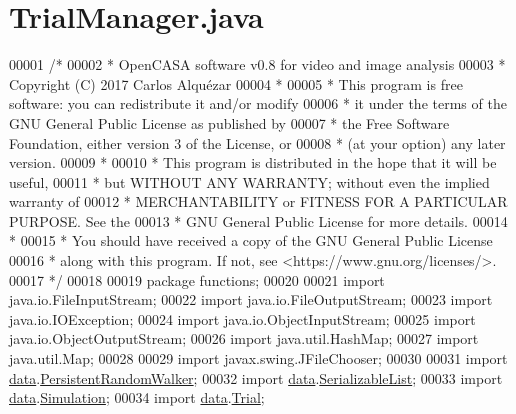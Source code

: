 \hypertarget{_trial_manager_8java_source}{}\section{Trial\+Manager.\+java}
\label{_trial_manager_8java_source}

\begin{DoxyCode}
00001 \textcolor{comment}{/*}
00002 \textcolor{comment}{ *   OpenCASA software v0.8 for video and image analysis}
00003 \textcolor{comment}{ *   Copyright (C) 2017  Carlos Alquézar}
00004 \textcolor{comment}{ *}
00005 \textcolor{comment}{ *   This program is free software: you can redistribute it and/or modify}
00006 \textcolor{comment}{ *   it under the terms of the GNU General Public License as published by}
00007 \textcolor{comment}{ *   the Free Software Foundation, either version 3 of the License, or}
00008 \textcolor{comment}{ *   (at your option) any later version.}
00009 \textcolor{comment}{ *}
00010 \textcolor{comment}{ *   This program is distributed in the hope that it will be useful,}
00011 \textcolor{comment}{ *   but WITHOUT ANY WARRANTY; without even the implied warranty of}
00012 \textcolor{comment}{ *   MERCHANTABILITY or FITNESS FOR A PARTICULAR PURPOSE.  See the}
00013 \textcolor{comment}{ *   GNU General Public License for more details.}
00014 \textcolor{comment}{ *}
00015 \textcolor{comment}{ *   You should have received a copy of the GNU General Public License}
00016 \textcolor{comment}{ *   along with this program.  If not, see <https://www.gnu.org/licenses/>.}
00017 \textcolor{comment}{*/}    
00018 
00019 \textcolor{keyword}{package }functions;
00020 
00021 \textcolor{keyword}{import} java.io.FileInputStream;
00022 \textcolor{keyword}{import} java.io.FileOutputStream;
00023 \textcolor{keyword}{import} java.io.IOException;
00024 \textcolor{keyword}{import} java.io.ObjectInputStream;
00025 \textcolor{keyword}{import} java.io.ObjectOutputStream;
00026 \textcolor{keyword}{import} java.util.HashMap;
00027 \textcolor{keyword}{import} java.util.Map;
00028 
00029 \textcolor{keyword}{import} javax.swing.JFileChooser;
00030 
00031 \textcolor{keyword}{import} \hyperlink{namespacedata}{data}.\hyperlink{classdata_1_1_persistent_random_walker}{PersistentRandomWalker};
00032 \textcolor{keyword}{import} \hyperlink{namespacedata}{data}.\hyperlink{classdata_1_1_serializable_list}{SerializableList};
00033 \textcolor{keyword}{import} \hyperlink{namespacedata}{data}.\hyperlink{classdata_1_1_simulation}{Simulation};
00034 \textcolor{keyword}{import} \hyperlink{namespacedata}{data}.\hyperlink{classdata_1_1_trial}{Trial};

\end{DoxyCode}
